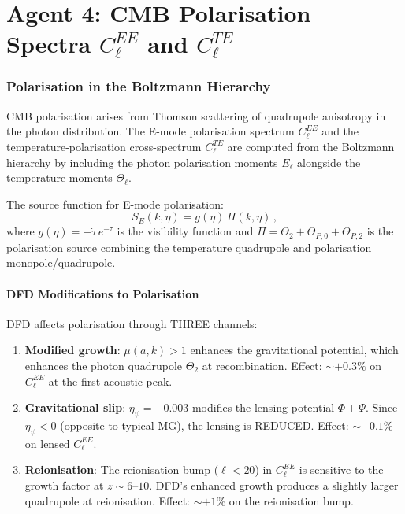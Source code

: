 \documentclass[11pt,a4paper]{article}
\begin{document}
\part{Agent 4: CMB Polarisation Spectra $C_\ell^{EE}$ and $C_\ell^{TE}$}
\label{part:polarisation}

\section{Polarisation in the Boltzmann Hierarchy}

CMB polarisation arises from Thomson scattering of quadrupole anisotropy in the photon distribution. The E-mode polarisation spectrum $C_\ell^{EE}$ and the temperature-polarisation cross-spectrum $C_\ell^{TE}$ are computed from the Boltzmann hierarchy by including the photon polarisation moments $E_\ell$ alongside the temperature moments $\Theta_\ell$.

The source function for E-mode polarisation:
\begin{equation}
S_E(k, \eta) = g(\eta)\,\Pi(k, \eta)\,,
\end{equation}
where $g(\eta) = -\dot{\tau}\,e^{-\tau}$ is the visibility function and $\Pi = \Theta_2 + \Theta_{P,0} + \Theta_{P,2}$ is the polarisation source combining the temperature quadrupole and polarisation monopole/quadrupole.

\subsection{DFD Modifications to Polarisation}

DFD affects polarisation through THREE channels:

\begin{enumerate}
\item \textbf{Modified growth}: $\mu(a,k) > 1$ enhances the gravitational potential, which enhances the photon quadrupole $\Theta_2$ at recombination. Effect: $\sim +0.3\%$ on $C_\ell^{EE}$ at the first acoustic peak.

\item \textbf{Gravitational slip}: $\eta_\psi = -0.003$ modifies the lensing potential $\Phi + \Psi$. Since $\eta_\psi < 0$ (opposite to typical MG), the lensing is REDUCED. Effect: $\sim -0.1\%$ on lensed $C_\ell^{EE}$.

\item \textbf{Reionisation}: The reionisation bump ($\ell < 20$) in $C_\ell^{EE}$ is sensitive to the growth factor at $z \sim 6$--$10$. DFD's enhanced growth produces a slightly larger quadrupole at reionisation. Effect: $\sim +1\%$ on the reionisation bump.
\end{enumerate}
\end{document}
